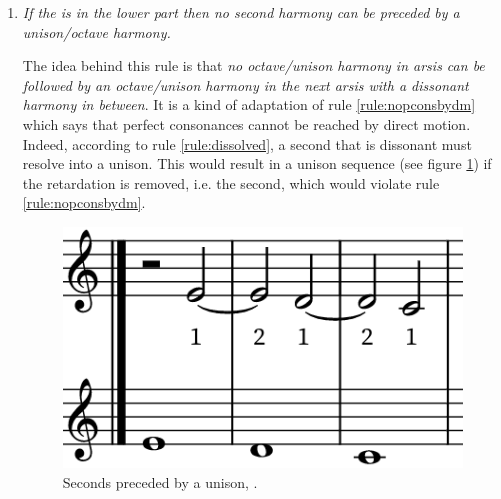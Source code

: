 \begin{enumerate}[wide, label=\bfseries 4.P\arabic*]
    \item\label{rule:nosecond} \textit{If the \cf is in the lower part then no second harmony can be preceded by a unison/octave harmony.} \parencite[p.79-80]{GaPFr}

    The idea behind this rule is that \emph{no octave/unison harmony in arsis can be followed by an octave/unison harmony in the next arsis with a dissonant harmony in between}. It is a kind of adaptation of rule \ref{rule:nopconsbydm} which says that perfect consonances cannot be reached by direct motion. Indeed, according to rule \ref{rule:dissolved}, a second that is dissonant must resolve into a unison. This would result in a unison sequence (see figure \ref{fig:secondpreuni}) if the retardation is removed, i.e. the second, which would violate rule \ref{rule:nopconsbydm}.
    \begin{figure}[h]
        \centering
        \includegraphics[height=\fhs]{Images/unisons_succ.png}
        \caption{Seconds preceded by a unison, .}
        \label{fig:secondpreuni}
    \end{figure}


\end{enumerate}
